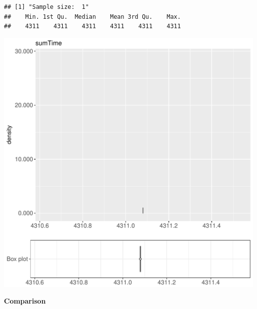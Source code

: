 \documentclass{article}\usepackage[]{graphicx}\usepackage[]{color}
\makeatletter
\def\maxwidth{ %
  \ifdim\Gin@nat@width>\linewidth
    \linewidth
  \else
    \Gin@nat@width
  \fi
}
\newenvironment{kframe}{%
 \def\at@end@of@kframe{}%
 \ifinner\ifhmode%
  \def\at@end@of@kframe{\end{minipage}}%
  \begin{minipage}{\columnwidth}%
 \fi\fi%
 \def\FrameCommand##1{\hskip\@totalleftmargin \hskip-\fboxsep
 \colorbox{shadecolor}{##1}\hskip-\fboxsep
     \hskip-\linewidth \hskip-\@totalleftmargin \hskip\columnwidth}%
 \MakeFramed {\advance\hsize-\width
   \@totalleftmargin\z@ \linewidth\hsize
   \@setminipage}}%
 {\par\unskip\endMakeFramed%
 \at@end@of@kframe}
\newenvironment{knitrout}{}{} %
\makeatother
\begin{document}
\begin{knitrout}
\color{fgcolor}\begin{kframe}
\begin{verbatim}
## [1] "Sample size:  1"
##    Min. 1st Qu.  Median    Mean 3rd Qu.    Max. 
##    4311    4311    4311    4311    4311    4311
\end{verbatim}


{\ttfamily\noindent\bfseries{}}\end{kframe}
\includegraphics[width=\maxwidth]{figure/RH1_nocache_crime-1} 

\end{knitrout}
  
 \textbf{Comparison}
  
\end{document}

